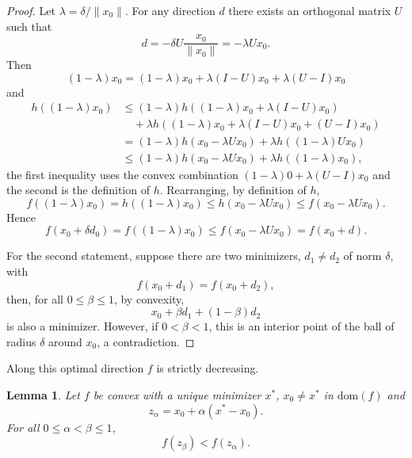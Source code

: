 \documentclass[12pt]{article}
\newtheorem{lemma}[theorem]{Lemma}
\begin{document}
\begin{proof}
Let $\lambda = \delta / \lVert x_{0} \rVert$.
For any direction $d$ there exists an orthogonal matrix $U$ such that
\begin{equation*}
d = - \delta U \frac{x_{0}}{\lVert x_{0} \rVert}
= - \lambda U x_{0}.
\end{equation*}
Then
\begin{equation*}
(1-\lambda) x_{0} = (1-\lambda) x_{0} +  \lambda (I - U)x_{0} + \lambda( U - I) x_{0}
\end{equation*}
and
\begin{align*}
h((1-\lambda)x_{0})
&\le (1 - \lambda ) h( (1- \lambda) x_{0} + \lambda (I - U)x_{0}) \\
&\quad+ \lambda h((1-\lambda) x_{0} + \lambda (I - U)x_{0} + (U - I)x_{0}) \\
&= (1- \lambda) h( x_{0} - \lambda U x_{0}) + \lambda h((1-\lambda) U x_{0}) \\
&\le (1- \lambda) h( x_{0} - \lambda U x_{0}) + \lambda h((1-\lambda) x_{0}),
\end{align*}
the first inequality uses the convex combination $(1- \lambda )0 + \lambda (U - I) x_{0}$ and the second is the definition of $h$.
Rearranging, by definition of $h$,
\begin{equation*}
f((1-\lambda)x_{0})
= h((1-\lambda)x_{0})
\le h(x_{0} - \lambda U x_{0})
\le f(x_{0} - \lambda U x_{0}).
\end{equation*}
Hence
\begin{equation*}
f(x_{0} + \delta d_{0})
= f((1- \lambda) x_{0})
\le f( x_{0} - \lambda U x_{0})
= f(x_{0} + d).
\end{equation*}

For the second statement, suppose there are two minimizers, $d_{1} \ne d_{2}$ of norm $\delta$, with
\begin{equation*}
f(x_{0} + d_{1}) = f(x_{0} + d_{2}),
\end{equation*}
then, for all $0 \le \beta \le 1$, by convexity,
\begin{equation*}
x_{0} + \beta d_{1} + (1- \beta) d_{2}
\end{equation*}
is also a minimizer.
However, if $0 < \beta < 1$, this is an interior point of the ball of radius $\delta$ around $x_{0}$, a contradiction.
\end{proof}

Along this optimal direction $f$ is strictly decreasing.

\begin{lemma}
\label{lemma_strictly_decreasing}
Let $f$ be convex with a unique minimizer $x^{\ast}$, $x_{0} \ne x^{\ast}$ in $\mathrm{dom}(f)$ and
\begin{equation*}
z_{\alpha} = x_{0} + \alpha ( x^{\ast} - x_{0}).
\end{equation*}
For all $0 \le \alpha < \beta \le 1$,
\begin{equation*}
f(z_{\beta}) < f(z_{\alpha}).
\end{equation*}
\end{lemma}
\end{document}
